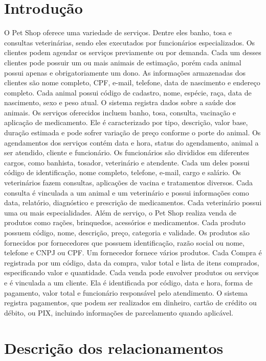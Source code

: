 \documentclass{article}
\begin{document}
\section{Introdução}
O Pet Shop oferece uma variedade de serviços. Dentre eles banho, tosa e consultas veterinárias,
sendo eles executados por funcionários especializados. Os clientes podem agendar os serviços
previamente ou por demanda. Cada um desses clientes pode possuir um ou mais animais de
estimação, porém cada animal possui apenas e obrigatoriamente um dono. As informações
armazenadas dos clientes são nome completo, CPF, e-mail, telefone, data de nascimento e
endereço completo. Cada animal possui código de cadastro, nome, espécie, raça, data de
nascimento, sexo e peso atual. O sistema registra dados sobre a saúde dos animais. Os serviços
oferecidos incluem banho, tosa, consulta, vacinação e aplicação de medicamento. Ele é
caracterizado por tipo, descrição, valor base, duração estimada e pode sofrer variação de preço
conforme o porte do animal. Os agendamentos dos serviços contém data e hora, status do
agendamento, animal a ser atendido, cliente e funcionário. Os funcionários são divididos em
diferentes cargos, como banhista, tosador, veterinário e atendente. Cada um deles possui código
de identificação, nome completo, telefone, e-mail, cargo e salário. Os veterinários fazem
consultas, aplicações de vacina e tratamentos diversos. Cada consulta é vinculada a um animal e
um veterinário e possui informações como data, relatório, diagnóstico e prescrição de
medicamentos. Cada veterinário possui uma ou mais especialidades. Além de serviço, o Pet
Shop realiza venda de produtos como rações, brinquedos, acessórios e medicamentos. Cada
produto possuem código, nome, descrição, preço, categoria e validade. Os produtos são
fornecidos por fornecedores que possuem identificação, razão social ou nome, telefone e CNPJ
ou CPF. Um fornecedor fornece vários produtos. Cada Compra é registrada por um código, data
da compra, valor total e lista de itens comprados, especificando valor e quantidade. Cada venda
pode envolver produtos ou serviços e é vinculada a um cliente. Ela é identificada por código,
data e hora, forma de pagamento, valor total e funcionário responsável pelo atendimento. O
sistema registra pagamentos, que podem ser realizados em dinheiro, cartão de crédito ou
débito, ou PIX, incluindo informações de parcelamento quando aplicável.

\newpage

\section{Descrição dos relacionamentos}
\end{document}
